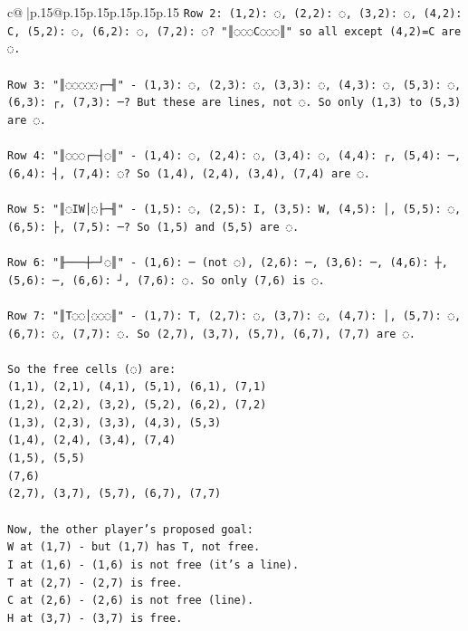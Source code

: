 \documentclass{article}
\begin{document}
{\begin{supertabular}{c@{$\;$}|p{.15\linewidth}@{}p{.15\linewidth}p{.15\linewidth}p{.15\linewidth}p{.15\linewidth}p{.15\linewidth}}
{{{\texttt{Row 2: (1,2): ◌, (2,2): ◌, (3,2): ◌, (4,2): C, (5,2): ◌, (6,2): ◌, (7,2): ◌? "║◌◌◌C◌◌◌║" so all except (4,2)=C are ◌.} \\
\\ 
\texttt{Row 3: "║◌◌◌◌◌┌─╢" {-} (1,3): ◌, (2,3): ◌, (3,3): ◌, (4,3): ◌, (5,3): ◌, (6,3): ┌, (7,3): ─? But these are lines, not ◌. So only (1,3) to (5,3) are ◌.} \\
\\ 
\texttt{Row 4: "║◌◌◌┌─┤◌║" {-} (1,4): ◌, (2,4): ◌, (3,4): ◌, (4,4): ┌, (5,4): ─, (6,4): ┤, (7,4): ◌? So (1,4), (2,4), (3,4), (7,4) are ◌.} \\
\\ 
\texttt{Row 5: "║◌IW│◌├─╢" {-} (1,5): ◌, (2,5): I, (3,5): W, (4,5): │, (5,5): ◌, (6,5): ├, (7,5): ─? So (1,5) and (5,5) are ◌.} \\
\\ 
\texttt{Row 6: "╟───┼─┘◌║" {-} (1,6): ─ (not ◌), (2,6): ─, (3,6): ─, (4,6): ┼, (5,6): ─, (6,6): ┘, (7,6): ◌. So only (7,6) is ◌.} \\
\\ 
\texttt{Row 7: "║T◌◌│◌◌◌║" {-} (1,7): T, (2,7): ◌, (3,7): ◌, (4,7): │, (5,7): ◌, (6,7): ◌, (7,7): ◌. So (2,7), (3,7), (5,7), (6,7), (7,7) are ◌.} \\
\\ 
\texttt{So the free cells (◌) are:} \\
\texttt{(1,1), (2,1), (4,1), (5,1), (6,1), (7,1)} \\
\texttt{(1,2), (2,2), (3,2), (5,2), (6,2), (7,2)} \\
\texttt{(1,3), (2,3), (3,3), (4,3), (5,3)} \\
\texttt{(1,4), (2,4), (3,4), (7,4)} \\
\texttt{(1,5), (5,5)} \\
\texttt{(7,6)} \\
\texttt{(2,7), (3,7), (5,7), (6,7), (7,7)} \\
\\ 
\texttt{Now, the other player's proposed goal:} \\
\texttt{W at (1,7) {-} but (1,7) has T, not free.} \\
\texttt{I at (1,6) {-} (1,6) is not free (it's a line).} \\
\texttt{T at (2,7) {-} (2,7) is free.} \\
\texttt{C at (2,6) {-} (2,6) is not free (line).} \\
\texttt{H at (3,7) {-} (3,7) is free.} \\
\\ 
}}}
\end{supertabular}}
\end{document}
